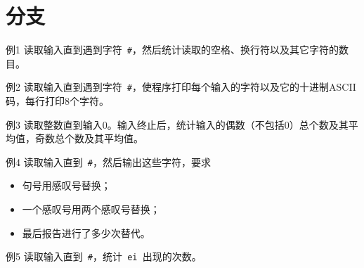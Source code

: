 \section{分支}
\begin{frame}[fragile]\ft{\secname}
\begin{block}{例1}
读取输入直到遇到字符\lstinline| #|，然后统计读取的空格、换行符以及其它字符的数目。
\end{block}
\end{frame}

\begin{frame}[fragile]\ft{\secname}
\begin{block}{例2}
读取输入直到遇到字符\lstinline| #|，使程序打印每个输入的字符以及它的十进制ASCII码，每行打印8个字符。
\end{block}
\end{frame}


\begin{frame}[fragile]\ft{\secname}
\begin{block}{例3}
读取整数直到输入0。输入终止后，统计输入的偶数（不包括0）总个数及其平均值，奇数总个数及其平均值。
\end{block}
\end{frame}

\begin{frame}[fragile]\ft{\secname}
\begin{block}{例4}
读取输入直到\lstinline| #|，然后输出这些字符，要求
\begin{itemize}
\item 句号用感叹号替换；
\item 一个感叹号用两个感叹号替换；
\item 最后报告进行了多少次替代。
\end{itemize}
\end{block}
\end{frame}

\begin{frame}[fragile]\ft{\secname}
\begin{block}{例5}
读取输入直到\lstinline| #|，统计\lstinline| ei |出现的次数。
\end{block}
\end{frame}
